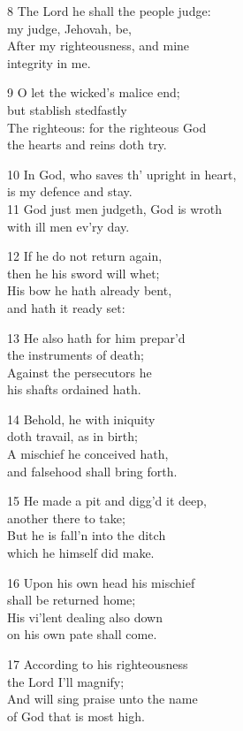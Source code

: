 8 The Lord he shall the people judge:\\
my judge, Jehovah, be,\\
After my righteousness, and mine\\
integrity in me.

9 O let the wicked’s malice end;\\
but stablish stedfastly\\
The righteous: for the righteous God\\
the hearts and reins doth try.

10 In God, who saves th’ upright in heart,\\
is my defence and stay.\\
11 God just men judgeth, God is wroth\\
with ill men ev’ry day.

12 If he do not return again,\\
then he his sword will whet;\\
His bow he hath already bent,\\
and hath it ready set:

13 He also hath for him prepar’d\\
the instruments of death;\\
Against the persecutors he\\
his shafts ordained hath.

14 Behold, he with iniquity\\
doth travail, as in birth;\\
A mischief he conceived hath,\\
and falsehood shall bring forth.

15 He made a pit and digg’d it deep,\\
another there to take;\\
But he is fall’n into the ditch\\
which he himself did make.

16 Upon his own head his mischief\\
shall be returned home;\\
His vi’lent dealing also down\\
on his own pate shall come.

17 According to his righteousness\\
the Lord I’ll magnify;\\
And will sing praise unto the name\\
of God that is most high.

\begin{center}
\quad{}\quad{}
\end{center}


